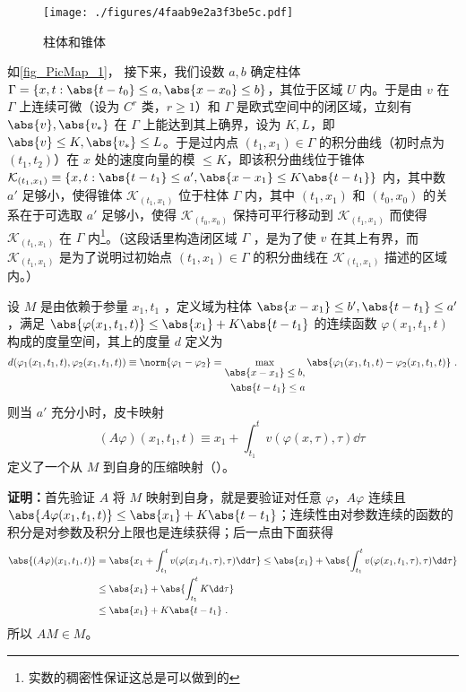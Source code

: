 \begin{figure}[ht]
\centering
\texttt{[image: ./figures/4faab9e2a3f3be5c.pdf]}
\caption{柱体和锥体} \label{fig_PicMap_1}
\end{figure}
如\autoref{fig_PicMap_1}， 接下来，我们设数 $a,b$ 确定柱体 $\Gamma=\{x,t:\abs{t-t_0}\leq a,\abs{x-x_0}\leq b\}$，其位于区域 $U$ 内。于是由 $v$ 在 $\Gamma$ 上连续可微（设为 $C^r$ 类，$r\geq1$）和 $\Gamma$ 是欧式空间中的闭区域，立刻有 $\abs{v},\abs{v_*}$ 在 $\Gamma$ 上能达到其上确界，设为 $K,L$，即 $\abs{v}\leq K,\abs{v_*}\leq L$。于是过内点 $(t_1,x_1)\in\Gamma$ 的积分曲线（初时点为 $(t_1,t_2)$）在 $x$ 处的速度向量的模 $\leq K$，即该积分曲线位于锥体 $\mathcal K_{(t_1,x_1)}\equiv\{x,t:\abs{t-t_1}\leq a',\abs{x-x_1}\leq K\abs{t-t_1}\}$ 内，其中数 $a'$ 足够小，使得锥体 $\mathcal K_{(t_1,x_1)}$ 位于柱体 $\Gamma$ 内，其中 $(t_1,x_1)$ 和 $(t_0,x_0)$ 的关系在于可选取 $a'$ 足够小，使得 $\mathcal K_{(t_0,x_0)}$ 保持可平行移动到 $\mathcal K_{(t_1,x_1)}$ 而使得 $\mathcal K_{(t_1,x_1)}$ 在 $\Gamma$ 内\footnote{实数的稠密性保证这总是可以做到的}。（这段话里构造闭区域 $\Gamma$ ，是为了使 $v$ 在其上有界，而 $\mathcal K_{(t_1,x_1)}$ 是为了说明过初始点 $(t_1,x_1)\in\Gamma$ 的积分曲线在 $\mathcal K_{(t_1,x_1)}$ 描述的区域内。）

\begin{theorem}{}\label{the_PicMap_2}
设 $M$ 是由依赖于参量 $x_1,t_1$ ，定义域为柱体 $\abs{x-x_1}\leq b',\abs{t-t_1}\leq a'$，满足 $\abs{\varphi(x_1,t_1,t)}\leq \abs{x_1}+K\abs{t-t_1}$ 的连续函数 $\varphi(x_1,t_1,t)$ 构成的度量空间，其上的度量 $d$ 定义为
\begin{equation}
d(\varphi_1(x_1,t_1,t),\varphi_2(x_1,t_1,t))\equiv\norm{\varphi_1-\varphi_2}=\max_{\begin{aligned}\abs{x-x_1}\leq b,\\\abs{t-t_1}\leq a\end{aligned}}\abs{\varphi_1(x_1,t_1,t)-\varphi_2(x_1,t_1,t)}~.
\end{equation}
则当 $a'$ 充分小时，皮卡映射
\begin{equation}
(A\varphi)(x_1,t_1,t)\equiv x_1+\int_{t_1}^{t}v(\varphi(x,\tau),\tau)\dd \tau~
\end{equation}
定义了一个从 $M$ 到自身的压缩映射（）。
\end{theorem}
\textbf{证明：}首先验证 $A$ 将 $M$ 映射到自身，就是要验证对任意 $\varphi$，$A\varphi$ 连续且 $\abs{A\varphi(x_1,t_1,t)}\leq \abs{x_1}+K\abs{t-t_1}$；连续性由对参数连续的函数的积分是对参数及积分上限也是连续获得；后一点由下面获得
\begin{equation}
\begin{aligned}
\abs{(A\varphi)(x_1,t_1,t)}&=\abs{x_1+\int_{t_1}^t v(\varphi(x_1.t_1,\tau),\tau)\dd \tau}\leq\abs{x_1}+\abs{\int_{t_1}^t v(\varphi(x_1,t_1,\tau),\tau)\dd \tau}\\
&\leq\abs{x_1}+\abs{\int_{t_1}^t K\dd \tau}\\
&\leq\abs{x_1}+K\abs{t-t_1}~.
\end{aligned}
\end{equation}
所以 $AM\in M$。

